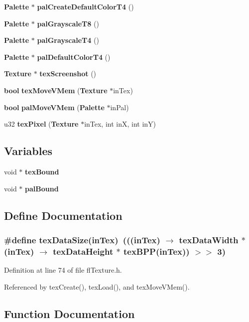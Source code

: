 \begin{CompactItemize}
\item 
{\bf Palette} $\ast$ {\bf pal\-Create\-Default\-Color\-T4} ()
\item 
{\bf Palette} $\ast$ {\bf pal\-Grayscale\-T8} ()
\item 
{\bf Palette} $\ast$ {\bf pal\-Grayscale\-T4} ()
\item 
{\bf Palette} $\ast$ {\bf pal\-Default\-Color\-T4} ()
\item 
{\bf Texture} $\ast$ {\bf tex\-Screenshot} ()
\item 
{\bf bool} {\bf tex\-Move\-VMem} ({\bf Texture} $\ast$in\-Tex)
\item 
{\bf bool} {\bf pal\-Move\-VMem} ({\bf Palette} $\ast$in\-Pal)
\item 
u32 {\bf tex\-Pixel} ({\bf Texture} $\ast$in\-Tex, int in\-X, int in\-Y)
\end{CompactItemize}
\subsection*{Variables}
\begin{CompactItemize}
\item 
void $\ast$ {\bf tex\-Bound}
\item 
void $\ast$ {\bf pal\-Bound}
\end{CompactItemize}


\subsection{Define Documentation}
\subsubsection{\setlength{\rightskip}{0pt plus 5cm}\#define tex\-Data\-Size(in\-Tex)~(((in\-Tex) $\rightarrow$ tex\-Data\-Width $\ast$ (in\-Tex) $\rightarrow$ tex\-Data\-Height $\ast$ tex\-BPP(in\-Tex)) $>$$>$ 3)}\label{flTexture_8h_4f72651997595c88d3f72f13f1bcb599}




Definition at line 74 of file fl\-Texture.h.

Referenced by tex\-Create(), tex\-Load(), and tex\-Move\-VMem().

\subsection{Function Documentation}
